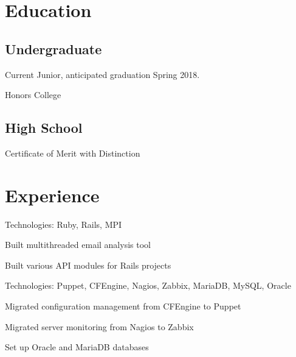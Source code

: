 \documentclass[letterpaper]{resume}
\begin{document}
\author{Lin DasSarma}
\maketitle

\section{Education}

\subsection{Undergraduate}

\begin{compactitem}
\item Current Junior, anticipated graduation Spring 2018.
\item Honors College
\end{compactitem}

\subsection{High School}

\begin{compactitem}
\item Certificate of Merit with Distinction
\end{compactitem}

\section{Experience}

\begin{compactitem}
\item Technologies: Ruby, Rails, MPI
\item Built multithreaded email analysis tool
\item Built various API modules for Rails projects
\end{compactitem}

\begin{compactitem}
\item Technologies: Puppet, CFEngine, Nagios, Zabbix, MariaDB, MySQL, Oracle
\item Migrated configuration management from CFEngine to Puppet
\item Migrated server monitoring from Nagios to Zabbix
\item Set up Oracle and MariaDB databases
\end{compactitem}
\end{document}
